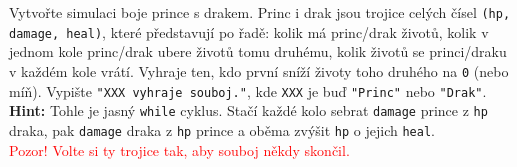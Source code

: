 \question[70]
Vytvořte simulaci boje prince s drakem. Princ i drak jsou trojice celých čísel
\texttt{(hp, damage, heal)}, které představují po řadě: kolik má princ/drak
životů, kolik v jednom kole princ/drak ubere životů tomu druhému, kolik životů
se princi/draku v každém kole vrátí. Vyhraje ten, kdo první sníží životy toho
druhého na \texttt{0} (nebo míň). Vypište \texttt{"XXX vyhraje souboj."}, kde
\texttt{XXX} je buď \texttt{"Princ"} nebo \texttt{"Drak"}.\\
\textbf{Hint:} Tohle je jasný \texttt{while} cyklus. Stačí každé kolo sebrat
\texttt{damage} prince z \texttt{hp} draka, pak \texttt{damage} draka z
\texttt{hp} prince a oběma zvýšit \texttt{hp} o jejich \texttt{heal}.\\
\textcolor{red}{Pozor! Volte si ty trojice tak, aby souboj někdy skončil.}